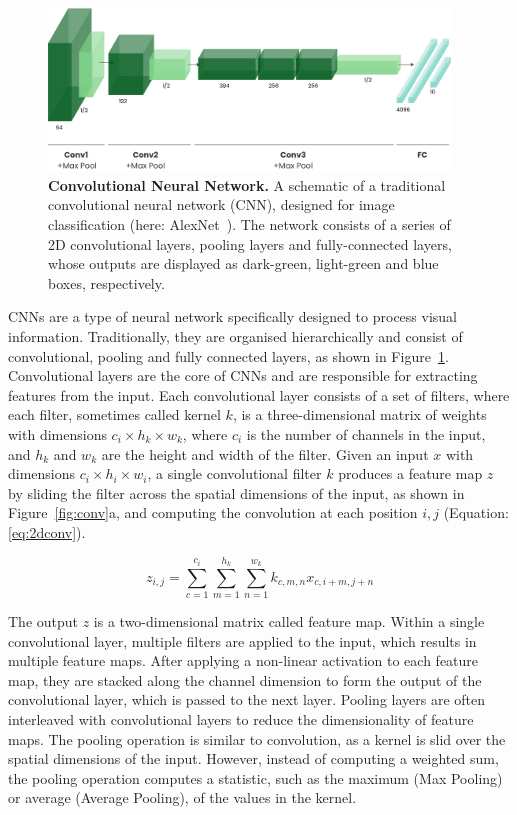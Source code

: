 \documentclass[a4paper]{article}
\begin{document}
\begin{figure}
  \begin{center}
    \includegraphics[width=0.95\textwidth]{./figures/alexnet.png}
  \end{center}
  \caption{\textbf{Convolutional Neural Network.} A schematic of a traditional
    convolutional neural network (CNN), designed for image classification (here:
    AlexNet~\cite{alexnet}). The network consists of a series of 2D
    convolutional layers, pooling layers and fully-connected layers, whose
  outputs are displayed as dark-green, light-green and blue boxes, respectively.
}
  \label{fig:cnn}
\end{figure}


CNNs are a type of neural network specifically designed to process visual
information. Traditionally, they are organised hierarchically and consist of
convolutional, pooling and fully connected layers, as shown in
Figure~\ref{fig:cnn}. Convolutional layers are the core of CNNs and are
responsible for extracting features from the input. Each convolutional layer
consists of a set of filters, where each filter, sometimes called kernel $k$, is
a three-dimensional matrix of weights with dimensions $c_i \times h_k \times
w_k$, where $c_i$ is the number of channels in the input, and $h_k$ and $w_k$
are the height and width of the filter. Given an input $x$ with dimensions $c_i
\times h_i \times w_i$, a single convolutional filter $k$ produces a feature map
$z$ by sliding the filter across the spatial dimensions of the input, as shown
in Figure~\ref{fig:conv}a, and computing the convolution at each position
${i,j}$ (Equation: \ref{eq:2dconv}).

\begin{equation}
  z_{i,j} = \sum_{c=1}^{c_i} \sum_{m=1}^{h_k} \sum_{n=1}^{w_k} 
  k_{c,m,n} x_{c,i+m,j+n}
  \label{eq:2dconv}
\end{equation}

The output $z$ is a two-dimensional matrix called feature map. Within a single
convolutional layer, multiple filters are applied to the input, which results in
multiple feature maps. After applying a non-linear activation to each feature
map, they are stacked along the channel dimension to form the output of the
convolutional layer, which is passed to the next layer. Pooling layers are often
interleaved with convolutional layers to reduce the dimensionality of feature
maps. The pooling operation is similar to convolution, as a kernel is slid over
the spatial dimensions of the input. However, instead of computing a weighted
sum, the pooling operation computes a statistic, such as the maximum (Max
Pooling) or average (Average Pooling), of the values in the kernel.
\end{document}
